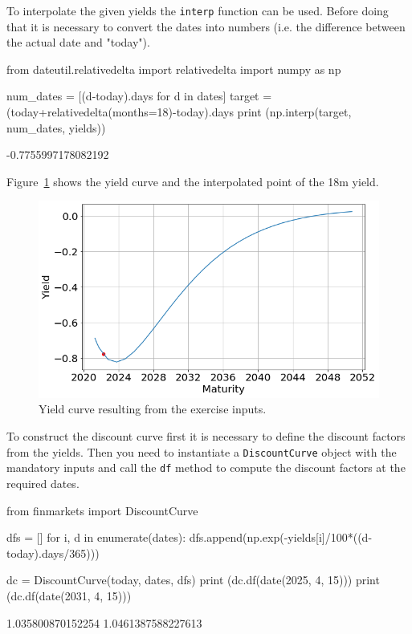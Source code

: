 \cprotEnv\begin{solution}
To interpolate the given yields the \texttt{interp} function can be used. Before doing that it is necessary to convert the dates into numbers (i.e. the difference between the actual date and "today").
\begin{ipython}
from dateutil.relativedelta import relativedelta
import numpy as np

num_dates = [(d-today).days for d in dates]
target = (today+relativedelta(months=18)-today).days
print (np.interp(target, num_dates, yields))
\end{ipython}
\begin{ioutput}
-0.7755997178082192
\end{ioutput}

Figure~\ref{fig:ex_yield} shows the yield curve and the interpolated point of the 18m yield.

\begin{figure}[htpb]
\centering
\includegraphics[width=0.7\linewidth]{figures/ex_yield}
\caption{Yield curve resulting from the exercise inputs.}
\label{fig:ex_yield}
\end{figure}

To construct the discount curve first it is necessary to define the discount factors from the yields. Then you need to instantiate a \texttt{DiscountCurve} object with the mandatory inputs and call the \texttt{df} method to compute the discount factors at the required dates.
\begin{ipython}
from finmarkets import DiscountCurve

dfs = []
for i, d in enumerate(dates):
    dfs.append(np.exp(-yields[i]/100*((d-today).days/365)))
    
dc = DiscountCurve(today, dates, dfs)
print (dc.df(date(2025, 4, 15)))
print (dc.df(date(2031, 4, 15)))
\end{ipython}
\begin{ioutput}
1.035800870152254
1.0461387588227613
\end{ioutput}


\end{solution}
